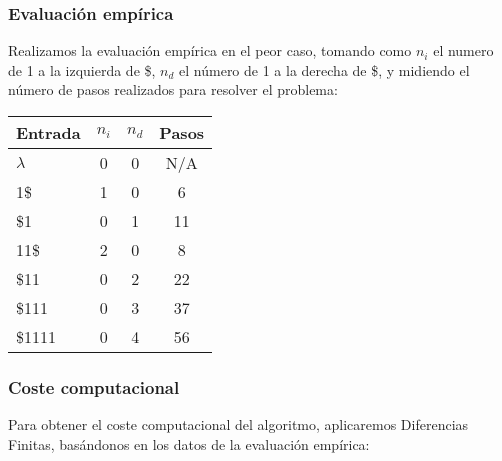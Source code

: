 \subsubsection*{Evaluación empírica}
Realizamos la evaluación empírica en el peor caso, tomando como $n_i$ el numero de 1 a la izquierda de \$, $n_d$ el número de 1 a la derecha de \$, y midiendo el número de pasos realizados para resolver el problema:

\begin{table}[h]
    \centering
    \begin{tabular}{lccc}
        Entrada & $n_i$ & $n_d$ & Pasos \\
        \hline
        $\lambda$               & 0  & 0  & N/A \\
        1\$                     & 1  & 0  & 6   \\
        \$1                     & 0  & 1  & 11  \\
        11\$                    & 2  & 0  & 8   \\
        \$11                    & 0  & 2  & 22  \\
        \$111                   & 0  & 3  & 37  \\
        \$1111                  & 0  & 4  & 56  \\
    \end{tabular}
\end{table}


\subsubsection*{Coste computacional}
Para obtener el coste computacional del algoritmo, aplicaremos Diferencias Finitas, basándonos en los datos de la evaluación empírica:




